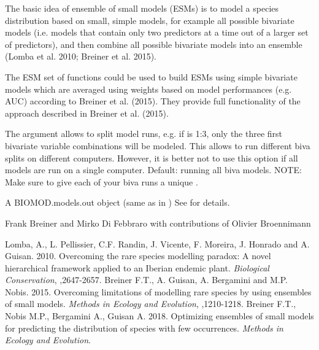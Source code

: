 \documentclass[a4paper]{book}
\begin{document}
%
\begin{Details}\relax
The basic idea of ensemble of small models (ESMs) is to model a species distribution based on small, simple models, for example all possible bivariate models (i.e. models that contain only two predictors at a time out of a larger set of predictors), and then combine all possible bivariate models into an ensemble (Lomba et al. 2010; Breiner et al. 2015).

The ESM set of functions could be used to build ESMs using simple bivariate models which are averaged using weights based on model performances (e.g. AUC) according to Breiner et al. (2015). They provide full functionality of the approach described in Breiner et al. (2015).

The argument  allows to split model runs, e.g. if  is 1:3, only the three first bivariate variable combinations will be modeled. This allows to run different biva splits on different computers. However, it is better not to use this option if all models are run on a single computer.
Default: running all biva models. 
NOTE: Make sure to give each of your biva runs a unique .
\end{Details}
%
\begin{Value}
A BIOMOD.models.out object (same as in )
See  for details.

\end{Value}
%
\begin{Author}\relax
Frank Breiner  and Mirko Di Febbraro  with contributions of Olivier Broennimann 
\end{Author}
%
\begin{References}\relax
Lomba, A., L. Pellissier, C.F. Randin, J. Vicente, F. Moreira, J. Honrado and A. Guisan. 2010. Overcoming the rare species modelling paradox: A novel hierarchical framework applied to an Iberian endemic plant. 
\emph{Biological Conservation}, ,2647-2657.
Breiner F.T., A. Guisan, A. Bergamini and M.P. Nobis. 2015. Overcoming limitations of modelling rare species by using ensembles of small models. \emph{Methods in Ecology and Evolution}, ,1210-1218.
Breiner F.T., Nobis M.P., Bergamini A., Guisan A. 2018. Optimizing ensembles of small models for predicting the distribution of species with few occurrences. \emph{Methods in Ecology and Evolution}. 

\end{References}
\end{document}
